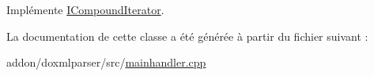 Implémente \hyperlink{class_i_compound_iterator_a424b2507309eb8780c9f37ad2969e518}{I\+Compound\+Iterator}.



La documentation de cette classe a été générée à partir du fichier suivant \+:\begin{DoxyCompactItemize}
\item 
addon/doxmlparser/src/\hyperlink{mainhandler_8cpp}{mainhandler.\+cpp}\end{DoxyCompactItemize}
